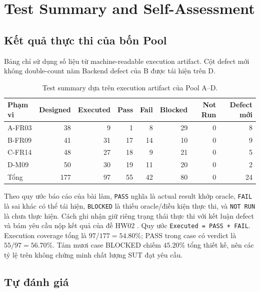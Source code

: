 \chapter{Test Summary and Self-Assessment}

\section{Kết quả thực thi của bốn Pool}

Bảng chỉ sử dụng số liệu từ machine-readable execution artifact. Cột defect
mới không double-count năm Backend defect của B được tái hiện trên D.

\begin{table}[H]
  \centering
  \small
  \begin{tabular}{lrrrrrrr}
    \toprule
    Phạm vi & Designed & Executed & Pass & Fail & Blocked & Not Run & Defect mới \\
    \midrule
    A-FR03 & 38 & 9 & 1 & 8 & 29 & 0 & 8 \\
    B-FR09 & 41 & 31 & 17 & 14 & 10 & 0 & 9 \\
    C-FR14 & 48 & 27 & 18 & 9 & 21 & 0 & 5 \\
    D-M09 & 50 & 30 & 19 & 11 & 20 & 0 & 2 \\
    \midrule
    Tổng & 177 & 97 & 55 & 42 & 80 & 0 & 24 \\
    \bottomrule
  \end{tabular}
  \caption{Test summary dựa trên execution artifact của Pool A--D.}
  \label{tab:overall-test-summary}
\end{table}

Theo quy ước báo cáo của bài làm, \texttt{PASS} nghĩa là actual result khớp
oracle, \texttt{FAIL} là sai khác có thể tái hiện, \texttt{BLOCKED} là thiếu
oracle/điều kiện thực thi, và \texttt{NOT RUN} là chưa thực hiện. Cách ghi nhận
giữ riêng trạng thái thực thi với kết luận defect và bám yêu cầu nộp kết quả của
đề HW02 \cite{hw02_assignment_2026}. Quy ước \texttt{Executed = PASS + FAIL}.
Execution coverage tổng là
\(97/177=54.80\%\); PASS trong case có verdict là \(55/97=56.70\%\). Tám mươi
case BLOCKED chiếm \(45.20\%\) tổng thiết kế, nên các tỷ lệ trên không chứng
minh chất lượng SUT đạt yêu cầu.

\section{Tự đánh giá}

